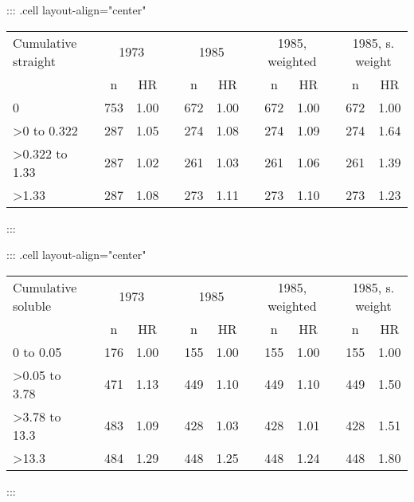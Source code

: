 \documentclass[
  11pt,
  letterpaper,
  DIV=11,
  numbers=noendperiod]{scrartcl}
\theoremstyle{remark}\newtheorem*{claim}{Claim}
\begin{document}
\begin{table}[H]
\centering
::: {.cell layout-align="center"}
\begin{tabular}{lcccccccccccc}
  \toprule
  Cumulative straight & &\multicolumn{2}{c}{1973} & &\multicolumn{2}{c}{1985} & &\multicolumn{2}{c}{1985, weighted} & &\multicolumn{2}{c}{1985, s. weight}\\
\cline{3-4}\cline{6-7}\cline{9-10}\cline{12-13}
&& n & HR&& n & HR&& n & HR&& n & HR\\ \midrule
0 &  & 753 & 1.00 &  & 672 & 1.00 &  & 672 & 1.00 &  & 672 & 1.00 \\ 
  >0 to 0.322 &  & 287 & 1.05 &  & 274 & 1.08 &  & 274 & 1.09 &  & 274 & 1.64 \\ 
  >0.322 to 1.33 &  & 287 & 1.02 &  & 261 & 1.03 &  & 261 & 1.06 &  & 261 & 1.39 \\ 
  >1.33 &  & 287 & 1.08 &  & 273 & 1.11 &  & 273 & 1.10 &  & 273 & 1.23 \\ 
   \bottomrule
\end{tabular}
:::
\end{table}

\begin{table}[H]
\centering
::: {.cell layout-align="center"}
\begin{tabular}{lcccccccccccc}
  \toprule
  Cumulative soluble & &\multicolumn{2}{c}{1973} & &\multicolumn{2}{c}{1985} & &\multicolumn{2}{c}{1985, weighted} & &\multicolumn{2}{c}{1985, s. weight}\\
\cline{3-4}\cline{6-7}\cline{9-10}\cline{12-13}
&& n & HR&& n & HR&& n & HR&& n & HR\\ \midrule
0 to 0.05 &  & 176 & 1.00 &  & 155 & 1.00 &  & 155 & 1.00 &  & 155 & 1.00 \\ 
  >0.05 to 3.78 &  & 471 & 1.13 &  & 449 & 1.10 &  & 449 & 1.10 &  & 449 & 1.50 \\ 
  >3.78 to 13.3 &  & 483 & 1.09 &  & 428 & 1.03 &  & 428 & 1.01 &  & 428 & 1.51 \\ 
  >13.3 &  & 484 & 1.29 &  & 448 & 1.25 &  & 448 & 1.24 &  & 448 & 1.80 \\ 
   \bottomrule
\end{tabular}
:::
\end{table}
\end{document}
